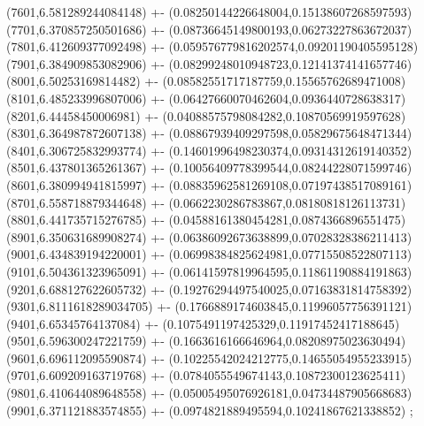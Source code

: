 {(7601,6.581289244084148) +- (0.08250144226648004,0.15138607268597593)
(7701,6.370857250501686) +- (0.08736645149800193,0.06273227863672037)
(7801,6.412609377092498) +- (0.059576779816202574,0.09201190405595128)
(7901,6.384909853082906) +- (0.08299248010948723,0.12141374141657746)
(8001,6.50253169814482) +- (0.08582551717187759,0.15565762689471008)
(8101,6.485233996807006) +- (0.06427660070462604,0.0936440728638317)
(8201,6.44458450006981) +- (0.04088575798084282,0.10870569919597628)
(8301,6.364987872607138) +- (0.08867939409297598,0.05829675648471344)
(8401,6.306725832993774) +- (0.14601996498230374,0.09314312619140352)
(8501,6.437801365261367) +- (0.10056409778399544,0.08244228071599746)
(8601,6.380994941815997) +- (0.08835962581269108,0.07197438517089161)
(8701,6.558718879344648) +- (0.0662230286783867,0.08180818126113731)
(8801,6.441735715276785) +- (0.04588161380454281,0.0874366896551475)
(8901,6.350631689908274) +- (0.06386092673638899,0.07028328386211413)
(9001,6.434839194220001) +- (0.06998384825624981,0.07715508522807113)
(9101,6.504361323965091) +- (0.06141597819964595,0.11861190884191863)
(9201,6.688127622605732) +- (0.19276294497540025,0.07163831814758392)
(9301,6.8111618289034705) +- (0.1766889174603845,0.11996057756391121)
(9401,6.65345764137084) +- (0.1075491197425329,0.11917452417188645)
(9501,6.596300247221759) +- (0.1663616166646964,0.08208975023630494)
(9601,6.696112095590874) +- (0.10225542024212775,0.14655054955233915)
(9701,6.609209163719768) +- (0.0784055549674143,0.10872300123625411)
(9801,6.410644089648558) +- (0.05005495076926181,0.04734487905668683)
(9901,6.371121883574855) +- (0.0974821889495594,0.10241867621338852)
};
